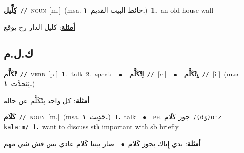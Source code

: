 \documentclass[10pt,a4paper,twoside]{article} %
\begin{document}
\begin{multicols}{2}
{\setlength\topsep{0pt}\textbf{\foreignlanguage{arabic}{كِلِّيل}}\ {\color{gray}\texttt{//}\color{black}}\ \textsc{noun}\ [m.]\ \color{gray}(msa. \foreignlanguage{arabic}{حائط البيت القديم}~\foreignlanguage{arabic}{\textbf{١.}})\color{black}\ \textbf{1.}~an old house wall\  \begin{flushright}\color{gray}\foreignlanguage{arabic}{\textbf{\underline{\foreignlanguage{arabic}{أمثلة}}}: كليل الدار رح يوقع}\end{flushright}\color{black}} \vspace{2mm}

\vspace{-3mm}
\subsection*{\color{blue}\foreignlanguage{arabic}{ك.ل.م}\color{blue}{}} 

{\setlength\topsep{0pt}\textbf{\foreignlanguage{arabic}{تْكَلَّم}}\ {\color{gray}\texttt{//}\color{black}}\ \textsc{verb}\ [p.]\ \textbf{1.}~talk  \textbf{2.}~speak\ \ $\bullet$\ \ \setlength\topsep{0pt}\textbf{\foreignlanguage{arabic}{اِتْكَلَّم}}\ {\color{gray}\texttt{//}\color{black}}\ [c.]\ \ $\bullet$\ \ \setlength\topsep{0pt}\textbf{\foreignlanguage{arabic}{يِتْكَلَّم}}\ {\color{gray}\texttt{//}\color{black}}\ [i.]\ \color{gray}(msa. \foreignlanguage{arabic}{يَتَحدَّث}~\foreignlanguage{arabic}{\textbf{١.}})\color{black}\  \begin{flushright}\color{gray}\foreignlanguage{arabic}{\textbf{\underline{\foreignlanguage{arabic}{أمثلة}}}: كل واحد يِتْكَلَّم عن حاله}\end{flushright}\color{black}} \vspace{2mm}

{\setlength\topsep{0pt}\textbf{\foreignlanguage{arabic}{كَلَام}}\ {\color{gray}\texttt{//}\color{black}}\ \textsc{noun}\ [m.]\ \color{gray}(msa. \foreignlanguage{arabic}{حَدِيث}~\foreignlanguage{arabic}{\textbf{١.}})\color{black}\ \textbf{1.}~talk\ \ $\bullet$\ \ \textsc{ph.} \color{gray} \foreignlanguage{arabic}{جوز كَلَام}\color{black}\ {\color{gray}\texttt{/{\sffamily (dʒ)oːz kalaːm}/}\color{black}}\ \textbf{1.}~want to discuss sth important with sb briefly\  \begin{flushright}\color{gray}\foreignlanguage{arabic}{\textbf{\underline{\foreignlanguage{arabic}{أمثلة}}}: بدي إِياك بجوز كَلام\ $\bullet$\ \  صار بيننا كَلام عادي بس فش شي مهم}\end{flushright}\color{black}} \vspace{2mm}


\end{multicols}
\end{document}
